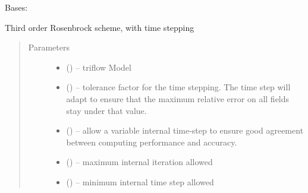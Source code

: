 \documentclass[letterpaper,10pt,english]{sphinxmanual}
\begin{document}

\begin{fulllineitems}
\label{\detokenize{triflow.plugins:triflow.plugins.schemes.ROS3PRw}}
Bases: {\hyperref[\detokenize{triflow.plugins:triflow.plugins.schemes.ROW_general}]{}}

Third order Rosenbrock scheme, with time stepping
\begin{quote}\begin{description}
\item[{Parameters}] \leavevmode\begin{itemize}
\item {} 
 () -- triflow Model

\item {} 
 (\sphinxstyleliteralemphasis{, }\sphinxstyleliteralemphasis{, }) -- tolerance factor for the time stepping. The time step will adapt to ensure that the maximum relative error on all fields stay under that value.

\item {} 
 (\sphinxstyleliteralemphasis{, }\sphinxstyleliteralemphasis{, }) -- allow a variable internal time-step to ensure good agreement between computing performance and accuracy.

\item {} 
 (\sphinxstyleliteralemphasis{, }\sphinxstyleliteralemphasis{, }) -- maximum internal iteration allowed

\item {} 
 (\sphinxstyleliteralemphasis{, }\sphinxstyleliteralemphasis{, }) -- minimum internal time step allowed

\end{itemize}

\end{description}\end{quote}

\end{fulllineitems}
\end{document}
